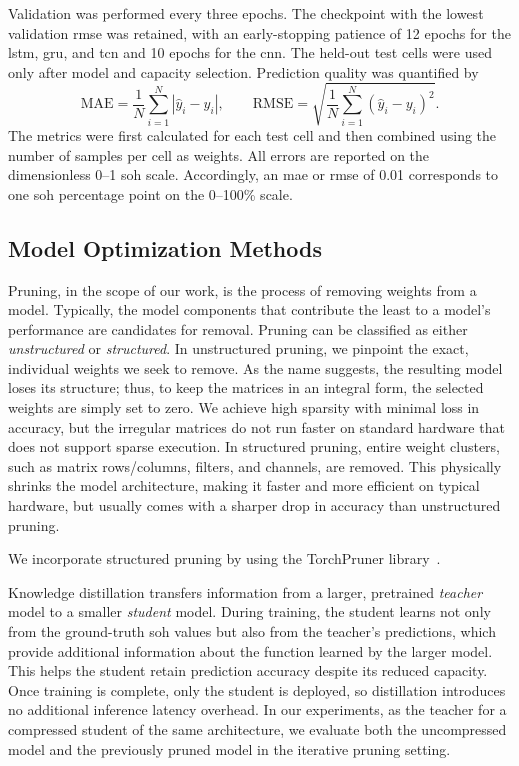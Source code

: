 \documentclass[final,3p,times]{elsarticle}
\begin{document}
Validation was performed every three epochs. The checkpoint with the lowest validation \ac{rmse} was retained, with an early-stopping patience of 12 epochs for the \ac{lstm}, \ac{gru}, and \ac{tcn} and 10 epochs for the \ac{cnn}. The held-out test cells were used only after model and capacity selection. Prediction quality was quantified by
\begin{equation}
    \mathrm{MAE}=\frac{1}{N}\sum_{i=1}^{N}\left|\hat{y}_i-y_i\right|,
    \qquad
    \mathrm{RMSE}=\sqrt{\frac{1}{N}\sum_{i=1}^{N}\left(\hat{y}_i-y_i\right)^2}.
\end{equation}
The metrics were first calculated for each test cell and then combined using the number of samples per cell as weights. All errors are reported on the dimensionless 0--1 \ac{soh} scale. Accordingly, an \ac{mae} or \ac{rmse} of 0.01 corresponds to one \ac{soh} percentage point on the 0--100\% scale.

\subsection{Model Optimization Methods} \label{sub:model_optimization}


Pruning, in the scope of our work, is the process of removing weights from a model. Typically, the model components that contribute the least to a model's performance are candidates for removal. Pruning can be classified as either \textit{unstructured} or \textit{structured}. In unstructured pruning, we pinpoint the exact, individual weights we seek to remove. As the name suggests, the resulting model loses its structure; thus, to keep the matrices in an integral form, the selected weights are simply set to zero. We achieve high sparsity with minimal loss in accuracy, but the irregular matrices do not run faster on standard hardware that does not support sparse execution. In structured pruning, entire weight clusters, such as matrix rows/columns, filters, and channels, are removed. This physically shrinks the model architecture, making it faster and more efficient on typical hardware, but usually comes with a sharper drop in accuracy than unstructured pruning.

We incorporate structured pruning by using the TorchPruner library~\cite{torchpruner}.

Knowledge distillation transfers information from a larger, pretrained \textit{teacher} model to a smaller \textit{student} model. During training, the student learns not only from the ground-truth \ac{soh} values but also from the teacher's predictions, which provide additional information about the function learned by the larger model. This helps the student retain prediction accuracy despite its reduced capacity. Once training is complete, only the student is deployed, so distillation introduces no additional inference latency overhead. In our experiments, as the teacher for a compressed student of the same architecture, we evaluate both the uncompressed model and the previously pruned model in the iterative pruning setting.
\end{document}
